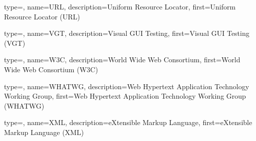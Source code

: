 {
	type=\acronymtype,
	name={URL},
	description={Uniform Resource Locator},
	first={Uniform Resource Locator (URL)}
}

{
	type=\acronymtype,
	name={VGT},
	description={Visual GUI Testing},
	first={Visual GUI Testing (VGT)}
}



{
	type=\acronymtype,
	name={W3C},
	description={World Wide Web Consortium},
	first={World Wide Web Consortium (W3C)}
}

{
	type=\acronymtype,
	name={WHATWG},
	description={Web Hypertext Application Technology Working Group},
	first={Web Hypertext Application Technology Working Group (WHATWG)}
}



{
	type=\acronymtype,
	name={XML},
	description={eXtensible Markup Language},
	first={eXtensible Markup Language (XML)}
}